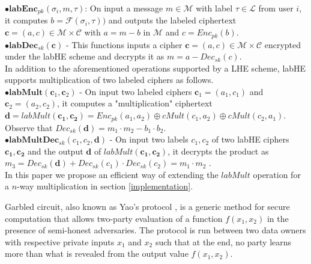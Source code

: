 $\bullet \textbf{labEnc}_{pk}(\sigma_i, m , \tau)$: On input a message $m \in \mathcal{M} $ with label $\tau \in \mathcal{L}$  from user $i$, it computes $b=\mathcal{F}(\sigma_i, \tau))$ and outputs the labeled ciphertext $\mathbf{c}=(a,c) \in \mathcal{M} \times \mathcal{C}$ with $ a= m- b$ in $\mathcal{M}$ and $c=Enc_{pk}(b)$.\\
$\bullet \textbf{labDec}_{sk}(\mathbf{c})$ - This functions inputs a cipher $\mathbf{c}=(a,c) \in \mathcal{M} \times \mathcal{C}$ encrypted under the labHE scheme and decrypts it as $m=a-Dec_{sk}(c)$.
\\
In addition to the aforementioned operations supported by a \textsf{LHE}  scheme, \textsf{labHE} supports multiplication of two labeled ciphers as follows.
\\ $\bullet \textbf{labMult}(\mathbf{c}_1,\mathbf{c}_2)$ -
On input two labeled ciphers $\mathbf{c}_1=(a_1,c_1)$ and $\mathbf{c}_2=(a_2,c_2)$, it computes a "multiplication" ciphertext $\mathbf{d}=labMult(\mathbf{c_1,c_2})=Enc_{pk}(a_1,a_2)\oplus cMult(c_1,a_2) \oplus cMult(c_2,a_1)$. Observe that $Dec_{sk}(\mathbf{d})=m_1\cdot m_2 -b_1 \cdot b_2$.\\
 $\bullet \textbf{labMultDec}_{sk}(c_1,c_2,\mathbf{d})$ - On input two labels $c_1,c_2$ of two labHE ciphers $\mathbf{c_1},\mathbf{c_2}$ and the output $\mathbf{d}$ of $labMult(\mathbf{c_1},\mathbf{c_2})$, it decrypts the product as $m_3=Dec_{sk}(\mathbf{d})+Dec_{sk}(c_1)\cdot Dec_{sk}(c_2) = m_1\cdot m_2$ .   \\
In this paper we propose an efficient way of extending the $labMult$ operation for a $n$-way multiplication in section \ref{implementation}.


Garbled circuit, also known as Yao's protocol \cite{Yao,yao2},  is a generic method for secure  computation that allows two-party evaluation of a function $f(x_1,x_2)$ in the presence of semi-honest adversaries. The protocol is run between two data owners with respective private inputs $x_1$ and $x_2$ such that at the end, no party learns more  
than what is revealed from the output value $f(x_1,x_2)$.  

